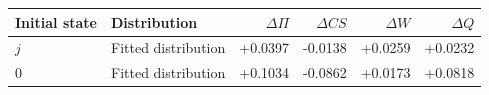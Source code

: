 \begin{tabular}{llrrrr}\toprule
Initial state & Distribution & $\Delta\Pi$ & $\Delta CS$ & $\Delta W$ & $\Delta Q$\\\midrule
$j$ & Fitted distribution & +0.0397 & -0.0138 & +0.0259 & +0.0232 \\
$0$ & Fitted distribution & +0.1034 & -0.0862 & +0.0173 & +0.0818 \\
\bottomrule\end{tabular}
